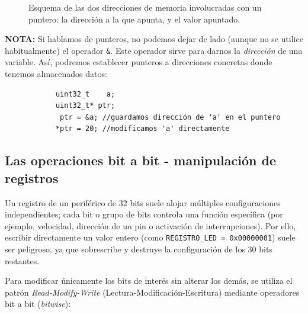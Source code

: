 \documentclass[../main.tex]{subfiles}
\begin{document}
\begin{figure}[htbp]
        \caption{Esquema de las dos direcciones de memoria involucradas con un puntero: la dirección a la que apunta, y el valor apuntado.}
        \label{fig:tabla_memoria_puntero_led}
        \end{figure}

        \textbf{NOTA:} Si hablamos de punteros, no podemos dejar de lado (aunque no se utilice habitualmente) el operador \lstinline|&|. Este operador sirve para darnos la \emph{dirección} de una variable. Así, podremos establecer punteros a direcciones concretas donde tenemos almacenados datos:
    
        \begin{lstlisting}
            uint32_t    a;
            uint32_t* ptr;
             ptr = &a; //guardamos dirección de 'a' en el puntero
            *ptr = 20; //modificamos 'a' directamente
        \end{lstlisting}


    \subsection{Las operaciones bit a bit - manipulación de registros}

        Un registro de un periférico de 32 bits suele alojar múltiples configuraciones independientes; cada bit o grupo de bits controla una función específica (por ejemplo, velocidad, dirección de un pin o activación de interrupciones). Por ello, escribir directamente un valor entero (como \texttt{REGISTRO\_LED = 0x00000001}) suele ser peligroso, ya que sobrescribe y destruye la configuración de los 30 bits restantes.

        Para modificar únicamente los bits de interés sin alterar los demás, se utiliza el patrón \emph{Read-Modify-Write} (Lectura-Modificación-Escritura) mediante operadores bit a bit (\emph{bitwise}):
\end{document}
